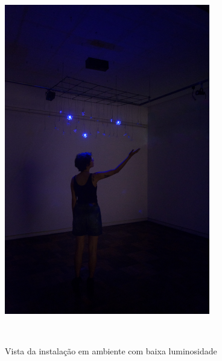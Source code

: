 \begin{apendicesenv}
\begin{figure}[H]
  \begin{center}
    \caption{Vista da instalação em ambiente com baixa luminosidade}
    \vspace*{0,2cm}
    \includegraphics[width=0.8\textwidth]{./04-figuras/instalacao_5}
    \label{fig:instalacao_5}
  \end{center}
  \vspace*{-0,9cm}
  \\
\end{figure}



\end{apendicesenv}
